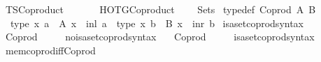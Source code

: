 %
\begin{isabellebody}%
%
%
\isadelimdocument
%
\endisadelimdocument
%
\isatagdocument
%
\isamarkuptrue%
%
\endisatagdocument
{\isafolddocument}%
%
\isadelimdocument
%
\endisadelimdocument
%
\isadelimtheory
%
\endisadelimtheory
%
\isatagtheory
{}\isamarkupfalse%
\ TSCoproduct\isanewline
\ \ \isanewline
\ \ \ \ HOTG{\isachardot}{\kern0pt}Coproduct\isanewline
\ \ \ \ Sets\isanewline
{}%
\endisatagtheory
{\isafoldtheory}%
%
\isadelimtheory
\isanewline
%
\endisadelimtheory
\isanewline
{}\isamarkupfalse%
\ {\isacharbrackleft}{\kern0pt}typedef{\isacharbrackright}{\kern0pt}{\isacharcolon}{\kern0pt}\ {\isachardoublequoteopen}Coprod\ A\ B\ {\isasymequiv}\isanewline
\ \ type\ {\isacharparenleft}{\kern0pt}{\isasymlambda}x{\isachardot}{\kern0pt}\ {\isasymexists}a\ {\isacharcolon}{\kern0pt}\ A{\isachardot}{\kern0pt}\ x\ {\isacharequal}{\kern0pt}\ inl\ a{\isacharparenright}{\kern0pt}\ {\isasymbar}\ type\ {\isacharparenleft}{\kern0pt}{\isasymlambda}x{\isachardot}{\kern0pt}\ {\isasymexists}b\ {\isacharcolon}{\kern0pt}\ B{\isachardot}{\kern0pt}\ x\ {\isacharequal}{\kern0pt}\ inr\ b{\isacharparenright}{\kern0pt}{\isachardoublequoteclose}\isanewline
\isanewline
{}\isamarkupfalse%
\ isa{\isacharunderscore}{\kern0pt}set{\isacharunderscore}{\kern0pt}coprod{\isacharunderscore}{\kern0pt}syntax\ \ \isamarkupfalse%
\ Coprod\ {\isacharparenleft}{\kern0pt}\ {\isachardoublequoteopen}{\isasymCoprod}{\isachardoublequoteclose}\ {}{}{\isacharparenright}{\kern0pt}\ \isamarkupfalse%
\isanewline
{}\isamarkupfalse%
\ no{\isacharunderscore}{\kern0pt}isa{\isacharunderscore}{\kern0pt}set{\isacharunderscore}{\kern0pt}coprod{\isacharunderscore}{\kern0pt}syntax\ \ \isamarkupfalse%
\ Coprod\ {\isacharparenleft}{\kern0pt}\ {\isachardoublequoteopen}{\isasymCoprod}{\isachardoublequoteclose}\ {}{}{\isacharparenright}{\kern0pt}\ \isamarkupfalse%
\isanewline
\isanewline
{}\isamarkupfalse%
\ isa{\isacharunderscore}{\kern0pt}set{\isacharunderscore}{\kern0pt}coprod{\isacharunderscore}{\kern0pt}syntax\isanewline
\isanewline
{}\isamarkupfalse%
\ mem{\isacharunderscore}{\kern0pt}coprod{\isacharunderscore}{\kern0pt}iff{\isacharunderscore}{\kern0pt}Coprod{\isacharcolon}{\kern0pt}\isanewline

\end{isabellebody}
